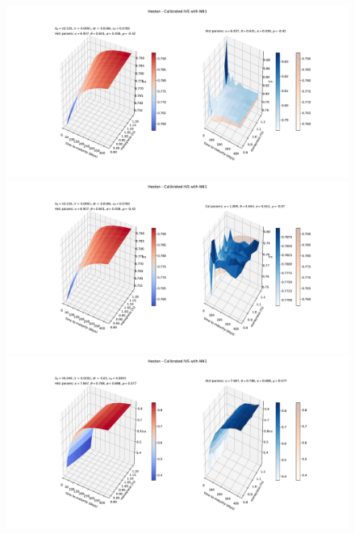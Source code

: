 \documentclass[
a4paper,     %
12pt           %
]{scrartcl}  %
\numberwithin{equation}{section}
\begin{document}
\begin{figure}
	\begin{minipage}{0.49\textwidth}
		\includegraphics[width=\textwidth]{fig/impvolsurf_0}
	\end{minipage}
	\begin{minipage}{0.49\textwidth}
		\includegraphics[width=\textwidth]{fig/impvolsurf_calibrated_0}
	\end{minipage}
	\begin{minipage}{0.49\textwidth}
		\includegraphics[width=\textwidth]{fig/impvolsurf_1}
	\end{minipage}
	\begin{minipage}{0.49\textwidth}

\end{minipage}
\end{figure}
\end{document}
